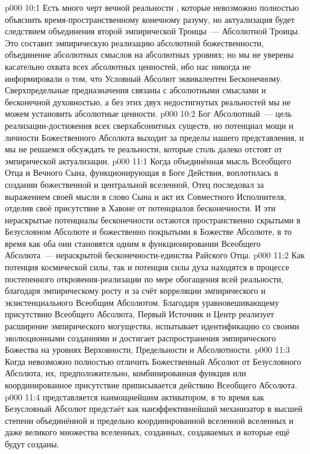 \vs p000 10:1 Есть много черт вечной реальности , которые невозможно полностью объяснить время\hyp{}пространственному конечному разуму, но актуализация  будет следствием объединения второй эмпирической Троицы~--- Абсолютной Троицы. Это составит эмпирическую реализацию абсолютной божественности, объединение абсолютных смыслов на абсолютных уровнях; но мы не уверены касательно охвата всех абсолютных ценностей, ибо нас никогда не информировали о том, что Условный Абсолют эквивалентен Бесконечному. Сверхпредельные предназначения связаны с абсолютными смыслами и бесконечной духовностью, а без этих двух недостигнутых реальностей мы не можем установить абсолютные ценности.
\vs p000 10:2 Бог Абсолютный~--- цель реализации\hyp{}достижения всех сверхабсонитных существ, но потенциал мощи и личности Божественного Абсолюта выходит за пределы нашего представления, и мы не решаемся обсуждать те реальности, которые столь далеко отстоят от эмпирической актуализации.
\vs p000 11:1 Когда объединённая мысль Всеобщего Отца и Вечного Сына, функционирующая в Боге Действия, воплотилась в создании божественной и центральной вселенной, Отец последовал за выражением своей мысли в слово Сына и акт их Совместного Исполнителя, отделив своё присутствие в Хавоне от потенциалов бесконечности. И эти нераскрытые потенциалы бесконечности остаются пространственно скрытыми в Безусловном Абсолюте и божественно покрытыми в Божестве Абсолюте, в то время как оба они становятся одним в функционировании Всеобщего Абсолюта~--- нераскрытой бесконечности\hyp{}единства Райского Отца.
\vs p000 11:2 Как потенция космической силы, так и потенция силы духа находятся в процессе постепенного откровения\hyp{}реализации по мере обогащения всей реальности, благодаря эмпирическому росту и за счёт корреляции эмпирического и экзистенциального Всеобщим Абсолютом. Благодаря уравновешивающему присутствию Всеобщего Абсолюта, Первый Источник и Центр реализует расширение эмпирического могущества, испытывает идентификацию со своими эволюционными созданиями и достигает распространения эмпирического Божества на уровнях Верховности, Предельности и Абсолютности.
\vs p000 11:3 \pc Когда невозможно полностью отличить Божественный Абсолют от Безусловного Абсолюта, их, предположительно, комбинированная функция или координированное присутствие приписывается действию Всеобщего Абсолюта.
\vs p000 11:4 \pc {} представляется наимощнейшим активатором, в то время как Безусловный Абсолют предстаёт как наиэффективнейший механизатор в высшей степени объединённой и предельно координированной вселенной вселенных и даже великого множества вселенных, созданных, создаваемых и которые ещё будут созданы.
